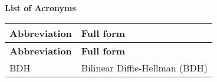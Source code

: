 \newpage

\thispagestyle{plain}

\noindent\textbf{\huge List of Acronyms}
\vspace{0.2cm}
\setlength{\tabcolsep}{4pt}
\vspace{-1em}
\addtolength\tabcolsep{.01pt}
\renewcommand{\arraystretch}{1.325}
\setlength{\LTcapwidth}{12in}

   \begin{longtable}{p{5cm} p{9cm}}
   \hline
   \textbf{Abbreviation}  & \textbf{Full form}\\
   \hline
   \endfirsthead
    \hline
   \textbf{Abbreviation}  & \textbf{Full form}\\
   \hline
    \endhead

    \hline
    \endfoot
    \hline
    \endlastfoot
BDH     & Bilinear Diffie-Hellman (BDH) \\

\hline
\end{longtable}
